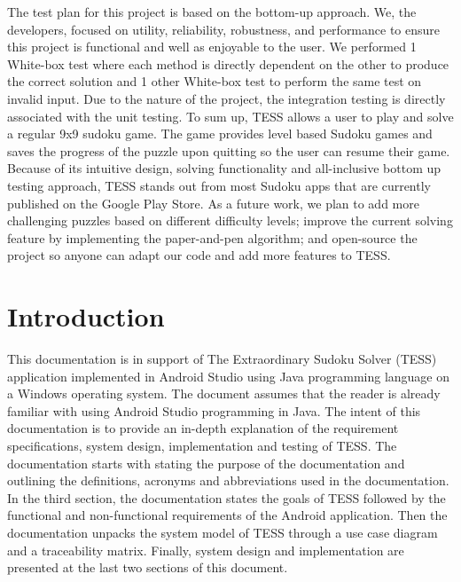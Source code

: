 \documentclass{article}
\begin{document}
The test plan for this project is based on the bottom-up approach. We, the developers, focused on utility, reliability, robustness, and performance to ensure this project is functional and well as enjoyable to the user. We performed 1 White-box test where each method is directly dependent on the other to produce the correct solution and 1 other White-box test to perform the same test on invalid input. Due to the nature of the project, the integration testing is directly associated with the unit testing. \newline \newline
To sum up, TESS allows a user to play and solve a regular 9x9 sudoku game. The game provides level based Sudoku games and saves the progress of the puzzle upon quitting so the user can resume their game. Because of its intuitive design, solving functionality and all-inclusive bottom up testing approach, TESS stands out from most Sudoku apps that are currently published on the Google Play Store. \newline \newline
As a future work, we plan to add more challenging puzzles based on different difficulty levels; improve the current solving feature by implementing the paper-and-pen algorithm; and open-source the project so anyone can adapt our code and add more features to TESS. 

 
\section{Introduction}
This documentation is in support of The Extraordinary Sudoku Solver (TESS) application implemented in Android Studio using Java programming language on a Windows operating system. The document assumes that the reader is already familiar with using Android Studio programming in Java. \newline \newline
The intent of this documentation is to provide an in-depth explanation of the requirement specifications, system design, implementation and testing of TESS.  \newline \newline
The documentation starts with stating the purpose of the documentation and outlining the definitions, acronyms and abbreviations used in the documentation. In the third section, the documentation states the goals of TESS followed by the functional and non-functional requirements of the Android application. Then the documentation unpacks the system model of TESS through a use case diagram and a traceability matrix. Finally, system design and implementation are presented at the last two sections of this document. 
\end{document}
